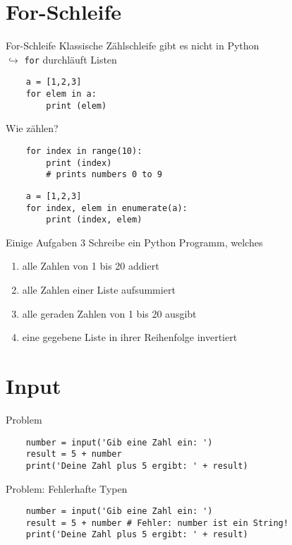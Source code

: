 \section{For-Schleife}

\begin{frame}[fragile]{For-Schleife}
	Klassische Zählschleife gibt es nicht in Python\\
	$\hookrightarrow$ \texttt{for} durchläuft Listen
	\begin{lstlisting}
	a = [1,2,3]
	for elem in a:
		print (elem)
	\end{lstlisting}
\end{frame}

\begin{frame}[fragile]{Wie zählen?}
	\begin{lstlisting}
	for index in range(10):
		print (index)
		# prints numbers 0 to 9
	\end{lstlisting}
	\begin{lstlisting}
	a = [1,2,3]
	for index, elem in enumerate(a):
		print (index, elem)
	\end{lstlisting}
\end{frame}

\begin{frame}{Einige Aufgaben 3}
	Schreibe ein Python Programm, welches
	\begin{enumerate}
		\item alle Zahlen von 1 bis 20 addiert
		\item alle Zahlen einer Liste aufsummiert
		\item alle geraden Zahlen von 1 bis 20 ausgibt
		\item eine gegebene Liste in ihrer Reihenfolge invertiert
	\end{enumerate}
\end{frame}


\section{Input}

\begin{frame}[fragile]{Problem}
	\begin{lstlisting}
	number = input('Gib eine Zahl ein: ')
	result = 5 + number
	print('Deine Zahl plus 5 ergibt: ' + result)
	\end{lstlisting}
\end{frame}

\begin{frame}[fragile]{Problem: Fehlerhafte Typen}
	\begin{lstlisting}
	number = input('Gib eine Zahl ein: ')
	result = 5 + number # Fehler: number ist ein String!
	print('Deine Zahl plus 5 ergibt: ' + result)
	\end{lstlisting}
\end{frame}



